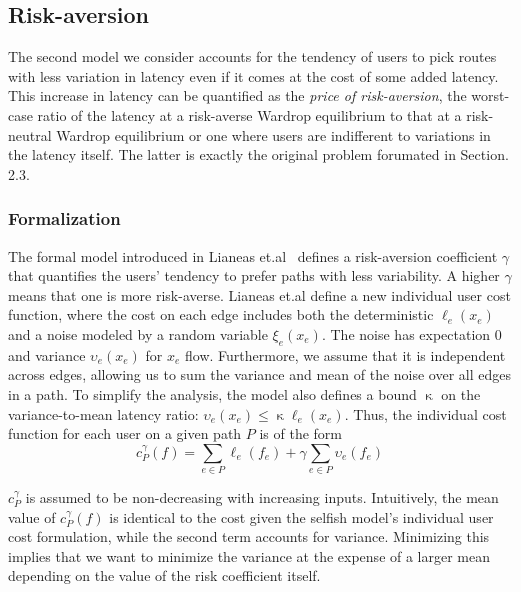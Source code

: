 \subsection{Risk-aversion}
The second model we consider accounts for the tendency of users to pick routes with less variation in latency even if it comes at the cost of some added latency. This increase in latency can be quantified as the {\em{price of risk-aversion}},
the worst-case ratio of the latency at a risk-averse Wardrop equilibrium to that at a risk-neutral
Wardrop equilibrium or one where users are indifferent to variations in the latency itself. The latter is exactly the original problem forumated in Section. 2.3.


\subsubsection{Formalization} The formal model introduced in Lianeas et.al~\cite{risk-averse} defines 
a risk-aversion coefficient $\gamma$ that quantifies the users' tendency to prefer paths with less variability. 
A higher $\gamma$ means that one is more risk-averse. Lianeas et.al define a new individual user cost function, where 
the cost on each edge includes both the deterministic $\ell_e(x_e)$ and a noise modeled by a random variable $\xi_e(x_e)$. The noise has expectation $0$ and variance $\upsilon_e(x_e)$ for $x_e$ flow. Furthermore, we assume that it is independent across edges, allowing us to sum the variance and mean of the noise over all edges in a path. To simplify the analysis, the model also defines a bound $\upkappa$ on the variance-to-mean latency ratio:
$\upsilon_e(x_e) \leq \upkappa \ell_e(x_e)$.
Thus, the individual cost function for each user on a given path $P$ is of the form
$$c^\gamma_P(f) = \sum_{e \in P}\ell_e(f_e) + \gamma \sum_{e \in P}\upsilon_e(f_e)$$

$c^\gamma_P$ is assumed to be non-decreasing with increasing inputs. Intuitively, the mean value of $c^\gamma_P(f)$ is identical to the cost given the selfish model's individual user cost formulation, while the second term accounts for variance. Minimizing this implies that we want to minimize the variance at the expense of a larger mean depending on the value of the risk coefficient itself.

